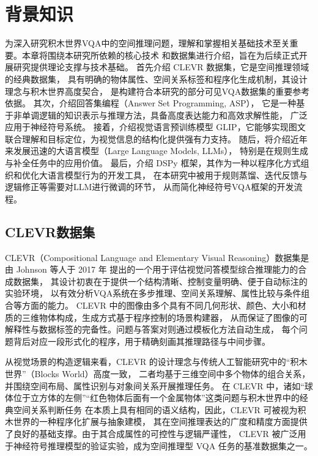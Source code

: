 \newtheorem{definition}{定义}[section]
\newtheorem{example}{例}[section]
\chapter{背景知识}
为深入研究积木世界VQA中的空间推理问题，理解和掌握相关基础技术至关重要。本章将围绕本研究所依赖的核心技术
和数据集进行介绍，旨在为后续正式开展研究提供理论支撑与技术基础。
首先介绍 CLEVR 数据集，它是空间推理领域的经典数据集，
具有明确的物体属性、空间关系标签和程序化生成机制，其设计理念与积木世界高度契合，
是构建符合本研究的部分可见VQA数据集的重要参考依据。
其次，介绍回答集编程（Answer Set Programming, ASP），
它是一种基于非单调逻辑的知识表示与推理方法，具备高度表达能力和高效求解性能，
广泛应用于神经符号系统。
接着，介绍视觉语言预训练模型 GLIP，它能够实现图文联合理解和目标定位，为视觉信息的结构化提供强有力支持。
随后，将介绍近年来发展迅速的大语言模型（Large Language Models, LLMs），
特别是在规则生成与补全任务中的应用价值。
最后，介绍 DSPy 框架，其作为一种以程序化方式组织和优化大语言模型行为的开发工具，
在本研究中被用于规则蒸馏、迭代反馈与逻辑修正等需要对LLM进行微调的环节，
从而简化神经符号VQA框架的开发流程。
\section{CLEVR数据集}
CLEVR（Compositional Language and Elementary Visual Reasoning）数据集是由 Johnson 等人于 2017 年
提出的一个用于评估视觉问答模型综合推理能力的合成数据集\cite{johnson2017clevr}，
其设计初衷在于提供一个结构清晰、控制变量明确、便于自动标注的实验环境，
以有效分析VQA系统在多步推理、空间关系理解、属性比较与条件组合等方面的能力。
CLEVR 中的图像由多个具有不同几何形状、颜色、大小和材质的三维物体构成，生成方式基于程序控制的场景构建器，
从而保证了图像的可解释性与数据标签的完备性。问题与答案对则通过模板化方法自动生成，
每个问题背后对应一段形式化的程序，用于精确刻画其推理路径与中间步骤。

从视觉场景的构造逻辑来看，CLEVR 的设计理念与传统人工智能研究中的“积木世界”（\-Blocks World）高度一致，
二者均基于三维空间中多个物体的组合关系，并围绕空间布局、属性识别与对象间关系开展推理任务。
在 CLEVR 中，诸如“球体位于立方体的左侧”“红色物体后面有一个金属物体”这类问题与积木世界中的经典空间关系判断任务
在本质上具有相同的语义结构，因此，CLEVR 可被视为积木世界的一种程序化扩展与抽象建模，
其在空间推理表达的广度和精度方面提供了良好的基础支撑。由于其合成属性的可控性与逻辑严谨性，
CLEVR 被广泛用于神经符号推理模型的验证实验，成为空间推理型 VQA 任务的基准数据集之一。

